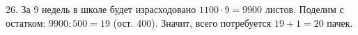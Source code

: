 26. За 9 недель в школе будет израсходовано $1100\cdot9=9900$ листов. Поделим с остатком: $9900:500=19$ (ост. 400). Значит, всего потребуется $19+1=20$ пачек.\\
